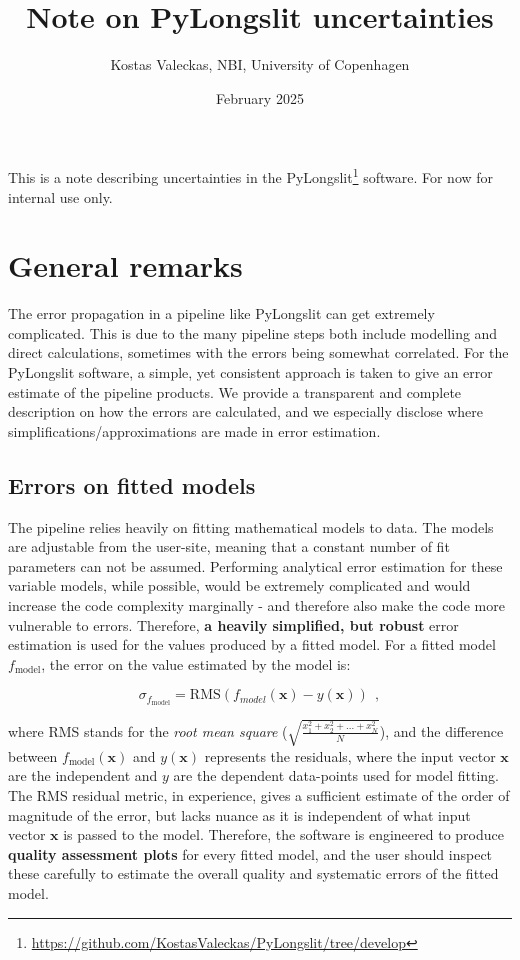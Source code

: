 \documentclass{article}
\title{Note on  PyLongslit uncertainties}
\author{Kostas Valeckas, NBI, University of Copenhagen}
\date{February 2025}
\begin{document}
\maketitle


This is a note describing uncertainties in the PyLongslit\footnote{\url{https://github.com/KostasValeckas/PyLongslit/tree/develop}} software. For now for internal use only.

\tableofcontents


\section{General remarks}

The error propagation in a pipeline like PyLongslit can get extremely complicated. This is due to the many pipeline steps both include modelling and direct calculations, sometimes with the errors being somewhat correlated. For the PyLongslit software, a simple, yet consistent approach is taken to give an error estimate of the pipeline products. We provide a transparent and complete description on how the errors are calculated, and we especially disclose where simplifications/approximations are made in error estimation.

\subsection{Errors on fitted models}

The pipeline relies heavily on fitting mathematical models to data. The models are adjustable from the user-site, meaning that a constant number of fit parameters can not be assumed. Performing analytical error estimation for these variable models, while possible, would be extremely complicated and would increase the code complexity marginally - and therefore also make the code more vulnerable to errors. Therefore, \textbf{a heavily simplified, but robust} error estimation is used for the values produced by a fitted model. For a fitted model $f_{\text{model}}$, the error on the value estimated by the model is:

\begin{equation}\label{model_error}
    \sigma_{f_{\text{model}}} = \text{RMS}({f_{model}}(\textbf{x}) - y(\textbf{x})) \ \ ,
\end{equation}

\noindent where RMS stands for the \textit{root mean square} ($\sqrt{\frac{x_{1}^2 + x_{2}^2 + ... + x_{N}^2}{N}}$), and the difference between $f_{\text{model}}(\textbf{x})$ and $y(\textbf{x})$ represents the residuals, where the input vector $\textbf{x}$ are the independent and $y$ are the dependent data-points used for model fitting. The RMS residual metric, in experience, gives a sufficient estimate of the order of magnitude of the error, but lacks nuance as it is independent of what input vector $\textbf{x}$ is passed to the model. Therefore, the software is engineered to produce \textbf{quality assessment plots} for every fitted model, and the user should inspect these carefully to estimate the overall quality and systematic errors of the fitted model. 
\end{document}

